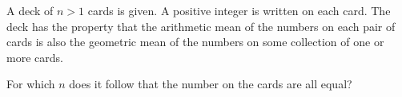 A deck of $n>1$ cards is given. A positive integer is written on each card. The deck has the property that the arithmetic mean of the numbers on each pair of cards is also the geometric mean of the numbers on some collection of one or more cards.

For which $n$ does it follow that the number on the cards are all equal?
